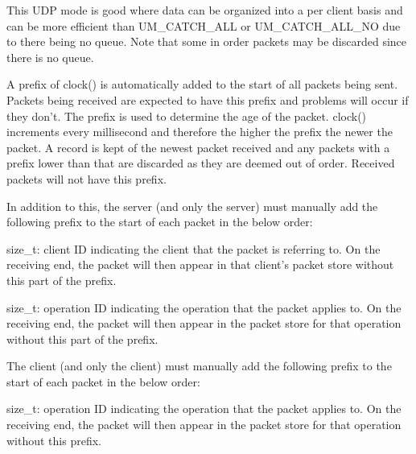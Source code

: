\begin{Desc}
\begin{description}
This UDP mode is good where data can be organized into a per client basis and can be more efficient than UM\_\-CATCH\_\-ALL or UM\_\-CATCH\_\-ALL\_\-NO due to there being no queue. Note that some in order packets may be discarded since there is no queue.\par
\par
 \item[{\em 
\hypertarget{classcl_shared_protocol_a4b0b9c82b8ae4eee78c6308c35afd47ba85523bd746d838b1620e0c4fc3da392e}{
UM\_\-PER\_\-CLIENT\_\-PER\_\-OPERATION}
\label{classcl_shared_protocol_a4b0b9c82b8ae4eee78c6308c35afd47ba85523bd746d838b1620e0c4fc3da392e}
}]A prefix of clock() is automatically added to the start of all packets being sent. Packets being received are expected to have this prefix and problems will occur if they don't. The prefix is used to determine the age of the packet. clock() increments every millisecond and therefore the higher the prefix the newer the packet. A record is kept of the newest packet received and any packets with a prefix lower than that are discarded as they are deemed out of order. Received packets will not have this prefix. \par
\par


In addition to this, the server (and only the server) must manually add the following prefix to the start of each packet in the below order:
\begin{DoxyItemize}
\item size\_\-t: client ID indicating the client that the packet is referring to. On the receiving end, the packet will then appear in that client's packet store without this part of the prefix.
\item size\_\-t: operation ID indicating the operation that the packet applies to. On the receiving end, the packet will then appear in the packet store for that operation without this part of the prefix.\par
\par

\end{DoxyItemize}

The client (and only the client) must manually add the following prefix to the start of each packet in the below order:
\begin{DoxyItemize}
\item size\_\-t: operation ID indicating the operation that the packet applies to. On the receiving end, the packet will then appear in the packet store for that operation without this prefix.\par
\par


\end{DoxyItemize}
\end{description}
\end{Desc}
